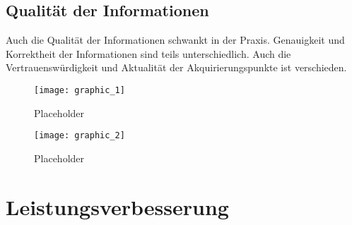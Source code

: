 \subsection{Qualität der Informationen}
Auch die Qualität der Informationen schwankt in der Praxis. Genauigkeit und Korrektheit der Informationen sind teils unterschiedlich. Auch die Vertrauenswürdigkeit und Aktualität der Akquirierungspunkte ist verschieden.
 

\begin{figure}[H]
\texttt{[image: graphic\_1]}
\caption{Placeholder}
\label{Placeholder}
\end{figure}
\begin{figure}[H]
\texttt{[image: graphic\_2]}
\caption{Placeholder}
\label{Placeholder}
\end{figure}

\section{Leistungsverbesserung}
